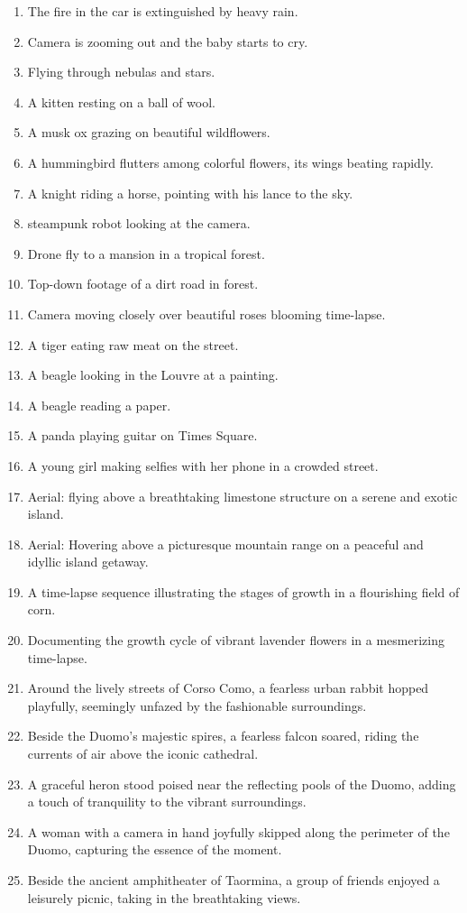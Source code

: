 \begin{enumerate}
    \item The fire in the car is extinguished by heavy rain.
    \item Camera is zooming out and the baby starts to cry.
    \item Flying through nebulas and stars.
    \item A kitten resting on a ball of wool.
    \item A musk ox grazing on beautiful wildflowers.
    \item A hummingbird flutters among colorful flowers, its wings beating rapidly.
    \item A knight riding a horse, pointing with his lance to the sky.
    \item steampunk robot looking at the camera.
    \item Drone fly to a mansion in a tropical forest.
    \item Top-down footage of a dirt road in forest.
    \item Camera moving closely over beautiful roses blooming time-lapse.
    \item A tiger eating raw meat on the street.
    \item A beagle looking in the Louvre at a painting.
    \item A beagle reading a paper.
    \item A panda playing guitar on Times Square.
    \item A young girl making selfies with her phone in a crowded street.
    \item Aerial: flying above a breathtaking limestone structure on a serene and exotic island.
    \item Aerial: Hovering above a picturesque mountain range on a peaceful and idyllic island getaway.
    \item A time-lapse sequence illustrating the stages of growth in a flourishing field of corn.
    \item Documenting the growth cycle of vibrant lavender flowers in a mesmerizing time-lapse.
    \item Around the lively streets of Corso Como, a fearless urban rabbit hopped playfully, seemingly unfazed by the fashionable surroundings.
    \item Beside the Duomo's majestic spires, a fearless falcon soared, riding the currents of air above the iconic cathedral.
    \item A graceful heron stood poised near the reflecting pools of the Duomo, adding a touch of tranquility to the vibrant surroundings.
    \item A woman with a camera in hand joyfully skipped along the perimeter of the Duomo, capturing the essence of the moment.
    \item Beside the ancient amphitheater of Taormina, a group of friends enjoyed a leisurely picnic, taking in the breathtaking views.
\end{enumerate}


